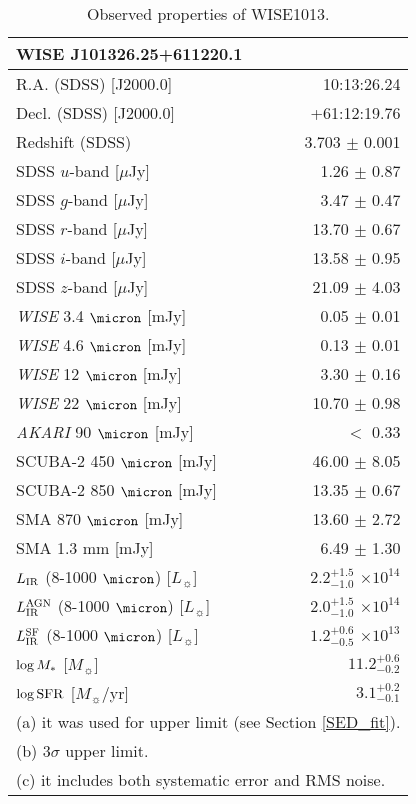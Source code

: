\documentclass[twocolumn]{aastex6}
\begin{document}
\begin{table}[h]
\renewcommand{\thetable}{\arabic{table}}
\centering
\caption{Observed properties of WISE1013.}
\label{Table}
\begin{tabular}{lr}
\tablewidth{0pt}
\hline
\hline
WISE J101326.25+611220.1		&								\\
\hline
R.A. (SDSS) [J2000.0] 			& 	10:13:26.24					\\
Decl. (SDSS) [J2000.0]			& 	+61:12:19.76  				\\
Redshift (SDSS)					&	3.703 $\pm$ 0.001			\\
SDSS $u$-band [$\mu$Jy]	&	1.26\tablenotemark{a} $\pm$ 0.87	\\
SDSS $g$-band [$\mu$Jy]	&	3.47 $\pm$ 0.47		\\
SDSS $r$-band [$\mu$Jy]	&	13.70 $\pm$ 0.67	\\
SDSS $i$-band [$\mu$Jy]	&	13.58 $\pm$ 0.95	\\
SDSS $z$-band [$\mu$Jy]	&	21.09 $\pm$ 4.03	\\
{\it WISE} 3.4 $\micron$ [mJy]	&	0.05 $\pm$ 0.01				\\
{\it WISE} 4.6 $\micron$ [mJy]	&	0.13 $\pm$ 0.01				\\
{\it WISE} 12  $\micron$ [mJy]	&	3.30 $\pm$ 0.16				\\
{\it WISE} 22  $\micron$ [mJy]	&	10.70 $\pm$ 0.98			\\
{\it AKARI} 90  $\micron$ [mJy]	&	$<$ 0.33\tablenotemark{b}	\\
SCUBA-2 450 $\micron$ [mJy]		&	46.00 $\pm$ 8.05\tablenotemark{c}			\\
SCUBA-2 850 $\micron$ [mJy]		&	13.35 $\pm$ 0.67\tablenotemark{c}			\\
SMA 870 $\micron$ [mJy]			&	13.60 $\pm$ 2.72\tablenotemark{c}	 		\\
SMA 1.3 mm [mJy]				&	6.49 $\pm$ 1.30\tablenotemark{c}				\\
$L_{\rm IR}$ (8-1000 $\micron$) [$L_{\sun}$]			&	$2.2^{+1.5}_{-1.0}$ $\times 10^{14}$	\\
$L^{\rm AGN}_{\rm IR}$ (8-1000 $\micron$) [$L_{\sun}$]	& 	$2.0^{+1.5}_{-1.0}$ $\times 10^{14}$	\\
$L^{\rm SF}_{\rm IR}$ (8-1000 $\micron$) [$L_{\sun}$]	& 	$1.2^{+0.6}_{-0.5}$ $\times 10^{13}$	\\
$\log M_{\rm *}$ [$M_{\sun}$]							& 	$11.2^{+0.6}_{-0.2}$				\\ 
$\log {\rm SFR}$ [$M_{\sun}$/yr]		 				& 	$3.1^{+0.2}_{-0.1}$					\\ 
\hline
\multicolumn{2}{l}{(a) it was used for upper limit (see Section \ref{SED_fit}).}\\
\multicolumn{2}{l}{(b) 3$\sigma$ upper limit.} \\
\multicolumn{2}{l}{(c) it includes both systematic error and RMS noise.}
\end{tabular}
\end{table}
\end{document}
